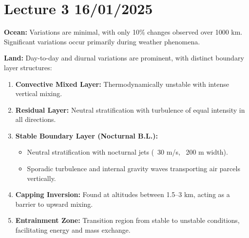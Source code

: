 \documentclass[fleqn,10pt]{SelfArx} %
\begin{document}
\clearpage
\section{Lecture 3 16/01/2025}

\textbf{Ocean:} Variations are minimal, with only 10\% changes observed over 1000 km. Significant variations occur primarily during weather phenomena.

\textbf{Land:} Day-to-day and diurnal variations are prominent, with distinct boundary layer structures:

\vspace{-0.25cm}
\begin{enumerate}[noitemsep]
	\item \textbf{Convective Mixed Layer:} Thermodynamically unstable with intense vertical mixing.
	\item \textbf{Residual Layer:} Neutral stratification with turbulence of equal intensity in all directions.
	\item \textbf{Stable Boundary Layer (Nocturnal B.L.):}
	      \begin{itemize}[noitemsep, topsep=0pt, partopsep=0pt]
		      \item Neutral stratification with nocturnal jets (~30 m/s, ~200 m width).
		      \item Sporadic turbulence and internal gravity waves transporting air parcels vertically.
	      \end{itemize}
	\item \textbf{Capping Inversion:} Found at altitudes between 1.5–3 km, acting as a barrier to upward mixing.
	\item \textbf{Entrainment Zone:} Transition region from stable to unstable conditions, facilitating energy and mass exchange.
\end{enumerate}
\end{document}
